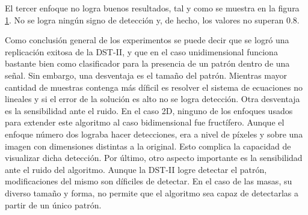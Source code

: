 \begin{figure}
	\caption{} \label{fig:example-mm-approach3}
\end{figure}

El tercer enfoque no logra buenos resultados, tal y como se muestra en la figura \ref{fig:example-mm-approach3}.
No se logra ningún signo de detección y, de hecho, los valores no superan $0.8$. 

Como conclusión general de los experimentos se puede decir que se logró una replicación exitosa de la DST-II,
y que en el caso unidimensional funciona bastante bien como clasificador para la presencia de un patrón 
dentro de una señal. Sin embargo, una desventaja es el tamaño del patrón. Mientras mayor cantidad
de muestras contenga más díficil es resolver el sistema de ecuaciones no lineales y si el error de la
solución es alto no se logra detección. Otra desventaja es la sensibilidad ante el ruido.
En el caso 2D, ninguno de los enfoques usados para extender este algoritmo al caso
bidimensional fue fructífero. Aunque el enfoque número dos lograba hacer detecciones, era a nivel de 
píxeles y sobre una imagen con dimensiones distintas a la original. Esto complica la capacidad de visualizar
dicha detección. Por último, otro aspecto importante es la sensibilidad ante el ruido del algoritmo. 
Aunque la DST-II logre detectar el patrón, modificaciones del mismo son díficiles de detectar.
En el caso de las masas, su diverso tamaño y forma, no permite que el algoritmo sea capaz de detectarlas
a partir de un único patrón.

